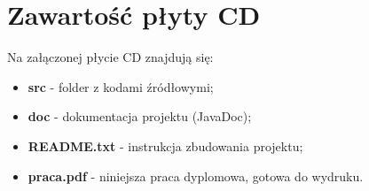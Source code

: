 \chapter{Zawartość płyty CD}
\thispagestyle{chapterBeginStyle}
\label{plytaCD}

{\color{dgray}
Na załączonej płycie CD znajdują się:
\begin{itemize}
    \item \textbf{src} - folder z kodami źródłowymi;
    \item \textbf{doc} - dokumentacja projektu (JavaDoc);
    \item \textbf{README.txt} - instrukcja zbudowania projektu;
    \item \textbf{praca.pdf} - niniejsza praca dyplomowa, gotowa do wydruku.
\end{itemize}
}

